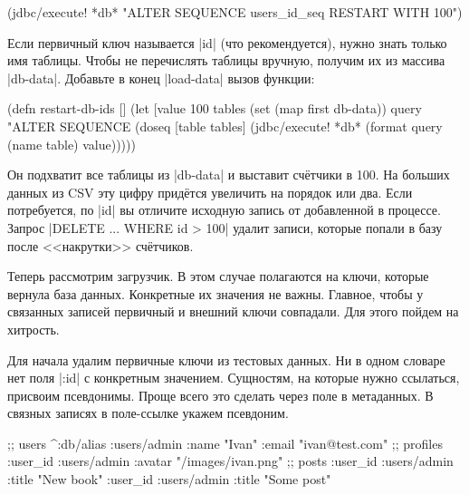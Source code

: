 \begin{english}
  \begin{clojure}
(jdbc/execute! *db*
  "ALTER SEQUENCE users_id_seq RESTART WITH 100")
  \end{clojure}
\end{english}

Если первичный ключ называется \spverb|id| (что рекомендуется), нужно знать
только имя таблицы. Чтобы не перечислять таблицы вручную, получим их из массива
\spverb|db-data|. Добавьте в конец \spverb|load-data| вызов функции:


\begin{english}
  \begin{clojure}
(defn restart-db-ids []
  (let [value 100
        tables (set (map first db-data))
        query "ALTER SEQUENCE %
    (doseq [table tables]
      (jdbc/execute! *db* (format query (name table) value)))))
  \end{clojure}
\end{english}

Он подхватит все таблицы из \spverb|db-data| и выставит сч\"{е}тчики в 100. На
больших данных из CSV эту цифру прид\"{е}тся увеличить на порядок или два. Если
потребуется, по \spverb|id| вы отличите исходную запись от добавленной в
процессе. Запрос \spverb|DELETE ... WHERE id > 100| удалит записи, которые
попали в базу после <<накрутки>> сч\"{е}тчиков.

Теперь рассмотрим загрузчик. В этом случае полагаются на ключи, которые вернула
база данных. Конкретные их значения не важны. Главное, чтобы у связанных записей
первичный и внешний ключи совпадали. Для этого пойдем на хитрость.

Для начала удалим первичные ключи из тестовых данных. Ни в одном словаре нет
поля \spverb|:id| с конкретным значением. Сущностям, на которые нужно ссылаться,
присвоим псевдонимы. Проще всего это сделать через поле в метаданных. В связных
записях в поле-ссылке укажем псевдоним.


\begin{english}
  \begin{clojure}
;; users
^{:db/alias :users/admin}
 {:name "Ivan" :email "ivan@test.com"}
;; profiles
{:user_id :users/admin :avatar "/images/ivan.png"}
;; posts
{:user_id :users/admin :title "New book"}
{:user_id :users/admin :title "Some post"}
  \end{clojure}
\end{english}

